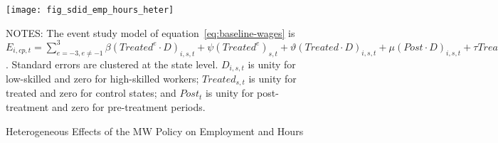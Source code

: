 \begin{figure}[H]
    \centering
    \texttt{[image: fig\_sdid\_emp\_hours\_heter]}
    \caption{Heterogeneous Effects of the MW Policy on Employment and Hours}
    \label{fig:baseline-manufacturing-industry-employment-heter}
    \begin{minipage}{\columnwidth}
        \vspace{0.05in}
        \tiny NOTES: The event study model of equation~\ref{eq:baseline-wages} is $E_{i,cp,t} = \sum_{{e = -3},{e \neq -1}}^{3} \beta (Treated^{e} \cdot D)_{i,s,t} + \psi (Treated^{e})_{s,t} + \vartheta (Treated \cdot D)_{i,s,t} + \mu (Post \cdot D)_{i,s,t} + \tau Treated_{s,t} + \rho D_{i,s,t} + \alpha Post_{t} + \delta X_{v,c,t-1} + \omega F_{f,t} + \lambda_{t} + \sigma_{c} + \phi_{cp} + \zeta_{cp,t} + \epsilon_{i,cp,t}$. Standard errors are clustered at the state level. $D_{i,s,t}$ is unity for low-skilled and zero for high-skilled workers; $Treated_{s,t}$ is unity for treated and zero for control states; and $Post_{t}$ is unity for post-treatment and zero for pre-treatment periods.
    \end{minipage}
\end{figure}

